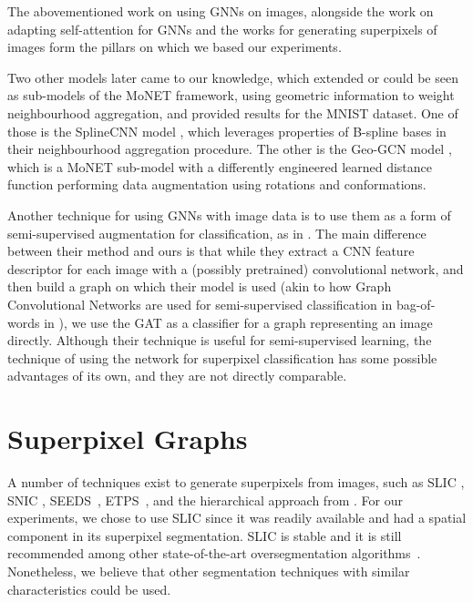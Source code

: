 \documentclass[twocolumn]{article}
\begin{document}
The abovementioned work on using GNNs on images, alongside the work on adapting self-attention for GNNs and the works for generating superpixels of images form the pillars on which we based our experiments.

Two other models later came to our knowledge, which extended or could be seen as sub-models of the MoNET framework, using geometric information to weight neighbourhood aggregation, and provided results for the MNIST dataset. One of those is the SplineCNN model \cite{fey2018splinecnn}, which leverages properties of B-spline bases in their neighbourhood aggregation procedure. The other is the Geo-GCN model \cite{spurek2019geogcn}, which is a MoNET sub-model with a differently engineered learned distance function performing data augmentation using rotations and conformations.

Another technique for using GNNs with image data is to use them as a form of semi-supervised augmentation for classification, 
as in \cite{jiang2019data}. The main difference between their method and ours is that while they extract a CNN feature descriptor for each image with a (possibly pretrained) convolutional network, and then build a graph on which their model is used (akin to how Graph Convolutional Networks are used for semi-supervised classification in bag-of-words in \cite{kipf2016semi}), we use the GAT as a classifier for a graph representing an image directly. Although their technique is useful for semi-supervised learning, the technique of using the network for superpixel classification has some possible advantages of its own, and they are not directly comparable.

\section{Superpixel Graphs}\label{sec:superpixel}

A number of techniques exist to generate superpixels from images, such as SLIC \cite{achanta2012slic}, SNIC \cite{achanta2017snic}, SEEDS~\cite{van2012seeds}, ETPS~\cite{yao2015real}, and the hierarchical approach from \cite{wei2018superpixel}. For our experiments, we chose to use SLIC \cite{achanta2012slic} since it was readily available and had a spatial component in its superpixel segmentation. SLIC is stable and it is still recommended among other state-of-the-art oversegmentation algorithms~\cite{stutz2018superpixels}. Nonetheless, we believe that other segmentation techniques with similar characteristics could be used.
\end{document}
